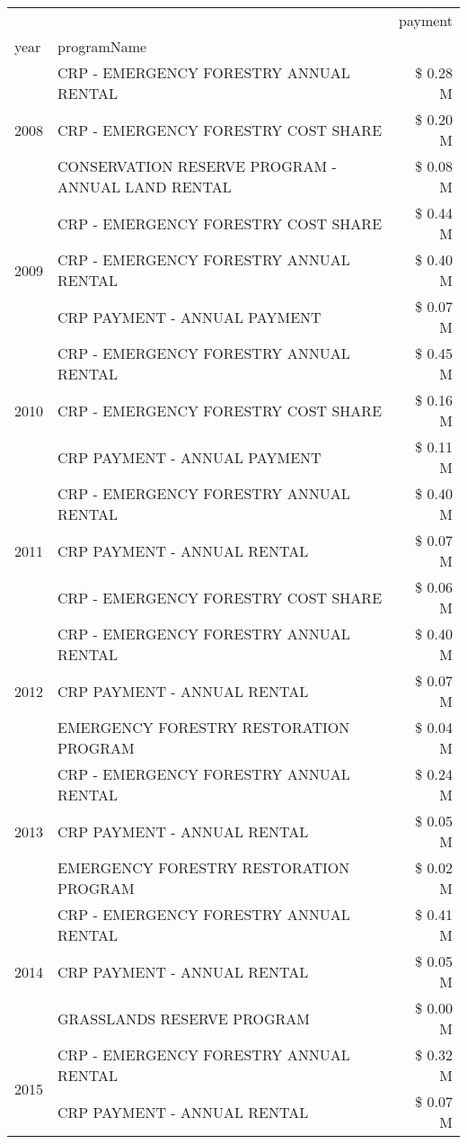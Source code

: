 \begin{tabular}{llr}
\toprule
 &  & payment \\
year & programName &  \\
\midrule
\multirow[t]{3}{*}{2008} & CRP - EMERGENCY FORESTRY ANNUAL RENTAL & \$ 0.28 M \\
 & CRP - EMERGENCY FORESTRY COST SHARE & \$ 0.20 M \\
 & CONSERVATION RESERVE PROGRAM - ANNUAL LAND RENTAL & \$ 0.08 M \\
\cline{1-3}
\multirow[t]{3}{*}{2009} & CRP - EMERGENCY FORESTRY COST SHARE & \$ 0.44 M \\
 & CRP - EMERGENCY FORESTRY ANNUAL RENTAL & \$ 0.40 M \\
 & CRP PAYMENT - ANNUAL PAYMENT & \$ 0.07 M \\
\cline{1-3}
\multirow[t]{3}{*}{2010} & CRP - EMERGENCY FORESTRY ANNUAL RENTAL & \$ 0.45 M \\
 & CRP - EMERGENCY FORESTRY COST SHARE & \$ 0.16 M \\
 & CRP PAYMENT - ANNUAL PAYMENT & \$ 0.11 M \\
\cline{1-3}
\multirow[t]{3}{*}{2011} & CRP - EMERGENCY FORESTRY ANNUAL RENTAL & \$ 0.40 M \\
 & CRP PAYMENT - ANNUAL RENTAL & \$ 0.07 M \\
 & CRP - EMERGENCY FORESTRY COST SHARE & \$ 0.06 M \\
\cline{1-3}
\multirow[t]{3}{*}{2012} & CRP - EMERGENCY FORESTRY ANNUAL RENTAL & \$ 0.40 M \\
 & CRP PAYMENT - ANNUAL RENTAL & \$ 0.07 M \\
 & EMERGENCY FORESTRY RESTORATION PROGRAM & \$ 0.04 M \\
\cline{1-3}
\multirow[t]{3}{*}{2013} & CRP - EMERGENCY FORESTRY ANNUAL RENTAL & \$ 0.24 M \\
 & CRP PAYMENT - ANNUAL RENTAL & \$ 0.05 M \\
 & EMERGENCY FORESTRY RESTORATION PROGRAM & \$ 0.02 M \\
\cline{1-3}
\multirow[t]{3}{*}{2014} & CRP - EMERGENCY FORESTRY ANNUAL RENTAL & \$ 0.41 M \\
 & CRP PAYMENT - ANNUAL RENTAL & \$ 0.05 M \\
 & GRASSLANDS RESERVE PROGRAM & \$ 0.00 M \\
\cline{1-3}
\multirow[t]{3}{*}{2015} & CRP - EMERGENCY FORESTRY ANNUAL RENTAL & \$ 0.32 M \\
 & CRP PAYMENT - ANNUAL RENTAL & \$ 0.07 M \\

\end{tabular}

